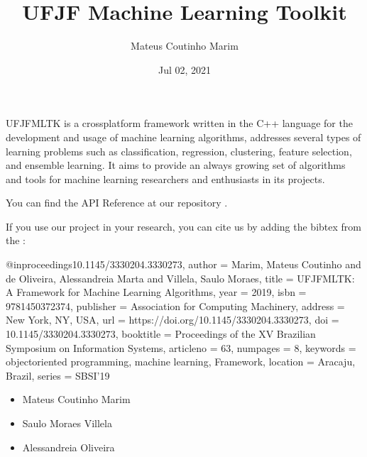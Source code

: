 \documentclass[letterpaper,10pt,english]{sphinxmanual}
\title{UFJF \sphinxhyphen{} Machine Learning Toolkit}
\date{Jul 02, 2021}
\author{Mateus Coutinho Marim}
\begin{document}
\pagestyle{empty}
\sphinxmaketitle
\pagestyle{plain}
\sphinxtableofcontents
\pagestyle{normal}
\label{\detokenize{index::doc}}


\sphinxAtStartPar
UFJF\sphinxhyphen{}MLTK is a cross\sphinxhyphen{}platform framework written in the C++ language for the development and
usage of machine learning algorithms, addresses several types of learning problems such as classification, regression,
clustering, feature selection, and ensemble learning. It aims to provide an always growing
set of algorithms and tools for machine learning researchers and enthusiasts in its projects.

\sphinxAtStartPar
{}

\sphinxAtStartPar
You can find the API Reference at our repository .

\sphinxAtStartPar
{}

\sphinxAtStartPar
If you use our project in your research, you can cite us by adding the bibtex from the :

\begin{sphinxVerbatim}[commandchars=\\\{\}]
@inproceedings\PYGZob{}10.1145/3330204.3330273,
   author = \PYGZob{}Marim, Mateus Coutinho and de Oliveira, Alessandreia Marta and Villela, Saulo Moraes\PYGZcb{},
   title = \PYGZob{}UFJF\PYGZhy{}MLTK: A Framework for Machine Learning Algorithms\PYGZcb{},
   year = \PYGZob{}2019\PYGZcb{},
   isbn = \PYGZob{}9781450372374\PYGZcb{},
   publisher = \PYGZob{}Association for Computing Machinery\PYGZcb{},
   address = \PYGZob{}New York, NY, USA\PYGZcb{},
   url = \PYGZob{}https://doi.org/10.1145/3330204.3330273\PYGZcb{},
   doi = \PYGZob{}10.1145/3330204.3330273\PYGZcb{},
   booktitle = \PYGZob{}Proceedings of the XV Brazilian Symposium on Information Systems\PYGZcb{},
   articleno = \PYGZob{}63\PYGZcb{},
   numpages = \PYGZob{}8\PYGZcb{},
   keywords = \PYGZob{}object\PYGZhy{}oriented programming, machine learning, Framework\PYGZcb{},
   location = \PYGZob{}Aracaju, Brazil\PYGZcb{},
   series = \PYGZob{}SBSI’19\PYGZcb{}
\PYGZcb{}
\end{sphinxVerbatim}

\sphinxAtStartPar
{}
\begin{itemize}
\item {} 
\sphinxAtStartPar
Mateus Coutinho Marim

\item {} 
\sphinxAtStartPar
Saulo Moraes Villela

\item {} 
\sphinxAtStartPar
Alessandreia Oliveira

\end{itemize}
\end{document}

